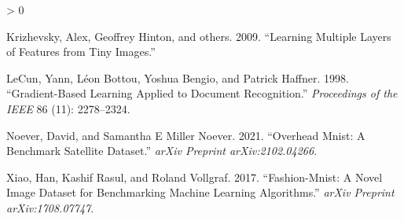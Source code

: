 \documentclass{article}
\newlength{\cslhangindent}
\newenvironment{CSLReferences}[2] %
 {%
  \setlength{\parindent}{0pt}
  \ifodd #1 \everypar{\setlength{\hangindent}{\cslhangindent}}\ignorespaces\fi
  \ifnum #2 > 0
  \setlength{\parskip}{#2\baselineskip}
  \fi
 }%
 {}
\begin{document}
\hypertarget{refs}{}
\begin{CSLReferences}{1}{0}
\leavevmode\hypertarget{ref-krizhevsky2009learning}{}%
Krizhevsky, Alex, Geoffrey Hinton, and others. 2009. {``Learning
Multiple Layers of Features from Tiny Images.''}

\leavevmode\hypertarget{ref-lecun1998gradient}{}%
LeCun, Yann, Léon Bottou, Yoshua Bengio, and Patrick Haffner. 1998.
{``Gradient-Based Learning Applied to Document Recognition.''}
\emph{Proceedings of the IEEE} 86 (11): 2278--2324.

\leavevmode\hypertarget{ref-noever2021overhead}{}%
Noever, David, and Samantha E Miller Noever. 2021. {``Overhead Mnist: A
Benchmark Satellite Dataset.''} \emph{arXiv Preprint arXiv:2102.04266}.

\leavevmode\hypertarget{ref-xiao2017fashion}{}%
Xiao, Han, Kashif Rasul, and Roland Vollgraf. 2017. {``Fashion-Mnist: A
Novel Image Dataset for Benchmarking Machine Learning Algorithms.''}
\emph{arXiv Preprint arXiv:1708.07747}.

\end{CSLReferences}



\end{document}
